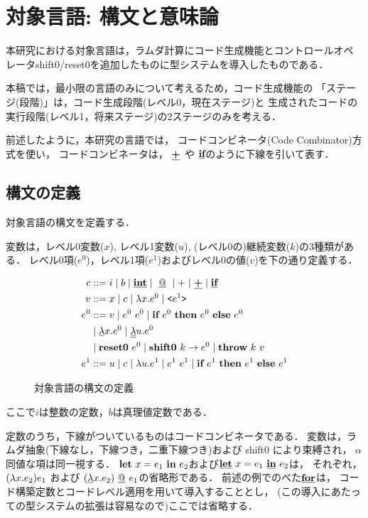 \chapter{対象言語: 構文と意味論}

本研究における対象言語は，ラムダ計算にコード生成機能とコントロールオペ
レータshift0/reset0を追加したものに型システムを導入したものである．

本稿では，最小限の言語のみについて考えるため，コード生成機能の
「ステージ(段階)」は，コード生成段階(レベル0，現在ステージ)と
生成されたコードの実行段階(レベル1，将来ステージ)の2ステージのみを考える．

前述したように，本研究の言語では，
コードコンビネータ(Code Combinator)方式を使い，
コードコンビネータは，
$\underline{\textbf{+}}$ や $\underline{\textbf{if}}$のように下線を引いて表す．

\section{構文の定義}

対象言語の構文を定義する．

変数は，レベル0変数($x$), レベル1変数($u$),
(レベル0の)継続変数($k$)の3種類がある．
レベル0項($e^0$)，レベル1項($e^1$)およびレベル0の値($v$)を下の通り定義する．

\begin{figure}[!ht]
  \centering
  \begin{align*}
    c & ::= i \mid b \mid \underline{\textbf{int}}
        \mid ~\underline{@}~ \mid + \mid \underline{\textbf{+}} \mid \underline{\textbf{if}} \\
    v & ::= x \mid c \mid \lambda{x}.{e^0} \mid \texttt{<}{e^1}\texttt{>} \\
    e^0 & ::=  v  \mid e^0~ e^0 \mid \textbf{if}~{e^0}~\textbf{then}~{e^0}~\textbf{else}~{e^0} \\
      & \mid \underline{\lambda}{x}.{e^0}
        \mid \underline{\underline{\lambda}}{u}.{e^0} \\
      & \mid \textbf{reset0}~{e^0}
        \mid \textbf{shift0}~{k}\to{e^0}
        \mid \textbf{throw}~{k}~{v} \\
    e^1 & ::=  u \mid c \mid \lambda{u}.{e^1} \mid e^1~ e^1
          \mid \textbf{if}~{e^1}~\textbf{then}~{e^1}~\textbf{else}~{e^1} \\
  \end{align*}
  \caption{対象言語の構文の定義}
\end{figure}

ここで$i$は整数の定数，$b$は真理値定数である．

定数のうち，下線がついているものはコードコンビネータである．
変数は，ラムダ抽象(下線なし，下線つき，二重下線つき)および shift0 により束縛され，
$\alpha$同値な項は同一視する．
$\textbf{let}~{x}={e_1}~\textbf{in}~{e_2}$および$\underline{\textbf{let}}~{x}={e_1}~\underline{\textbf{in}}~{e_2}$は，
それぞれ，$(\lambda{x}.{e_2})e_1$ および $(\underline{\lambda}{x}.{e_2})~\underline{@}~ e_1$の省略形である．
前述の例でのべた$\underline{\textbf{for}}$は，
コード構築定数とコードレベル適用を用いて導入することとし，
(この導入にあたっての型システムの拡張は容易なので)ここでは省略する．


